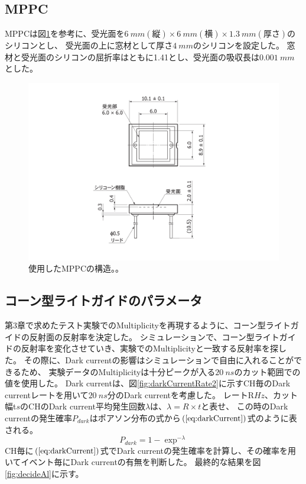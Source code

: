\subsection{MPPC}
MPPCは図\ref{fig:MPPCshape}を参考に、受光面を$\SI{6}{mm}(縦)\times\SI{6}{mm}(横)\times\SI{1.3}{mm}(厚さ)$のシリコンとし、
受光面の上に窓材として厚さ$\SI{4}{mm}$のシリコンを設定した。
窓材と受光面のシリコンの屈折率はともに1.41とし、受光面の吸収長は$\SI{0.001}{mm}$とした。

\begin{figure}
  \centering
  \includegraphics[width=15cm]{images/chapter4/MPPCshape.pdf}
  \caption{使用したMPPCの構造。。}
  \label{fig:MPPCshape}
\end{figure}

\subsection{コーン型ライトガイドのパラメータ}
第3章で求めたテスト実験でのMultiplicityを再現するように、コーン型ライトガイドの反射面の反射率を決定した。
シミュレーションで、コーン型ライトガイドの反射率を変化させていき、実験でのMultiplicityと一致する反射率を探した。
その際に、Dark currentの影響はシミュレーションで自由に入れることができるため、
実験データのMultiplicityは十分ピークが入る$\SI{20}{ns}$のカット範囲での値を使用した。
Dark currentは、図\ref{fig:darkCurrentRate2}に示すCH毎のDark currentレートを用いて$\SI{20}{ns}$分のDark currentを考慮した。
レートR\space$\si{Hz}$、カット幅t\space$\si{s}$のCHのDark current平均発生回数$\lambda$は、$\lambda=R\times t$と表せ、
この時のDark currentの発生確率$P_{dark}$はポアソン分布の式から$(\ref{eq:darkCurrent})$式のように表される。
\begin{equation}
  P_{dark} = 1 - \exp^{-\lambda}
  \label{eq:darkCurrent}
\end{equation}
CH毎に$(\ref{eq:darkCurrent})$式でDark currentの発生確率を計算し、その確率を用いてイベント毎にDark currentの有無を判断した。
最終的な結果を図\ref{fig:decideAl}に示す。

